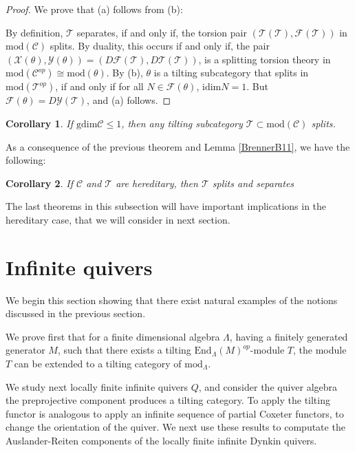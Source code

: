 \documentclass{amsart}
\theoremstyle{plain}
\newtheorem{corollary}{Corollary}
\numberwithin{equation}{section}
\begin{document}
\begin{proof}
We prove that (a) follows from (b):

By definition, $\mathcal{T}$ separates, if and only if, the torsion pair $(\mathscr{T}(\mathcal{T}),\mathscr{F}(\mathcal{T}))$ in $\mathrm{mod}(\mathcal{C})$ splits. By duality, this occurs if and only if, the pair $(\mathscr{X}(\theta ),\mathscr{Y}(\theta ))=(D\mathscr{F}(\mathcal{T}),D\mathscr{T}(\mathcal{T}))$, is a splitting torsion theory in $\mathrm{mod}(\mathcal{C}^{op})\cong \mathrm{mod}(\theta )$. By (b), $\theta $ is a
tilting subcategory that splits in $\mathrm{mod}(\mathcal{T}^{op})$, if and
only if for all $N\in \mathscr F(\theta )$, $\mathrm{idim}N=1$. But $\mathscr{F}(\theta )=D\mathscr{Y}(\mathcal{T})$, and (a) follows.
\end{proof}

\begin{corollary}
If $\mathrm{gdim}\mathcal{C}\leq 1$, then any tilting subcategory $\mathcal{T}\subset \mathrm{mod}(\mathcal{C})$ splits.
\end{corollary}

As a consequence of the previous theorem and Lemma \ref{BrennerB11}, we have
the following:

\begin{corollary}
If $\mathcal{C}$ and $\mathcal{T}$ are hereditary, then $\mathcal{T}$ splits
and separates
\end{corollary}

The last theorems in this subsection will have important implications in the
hereditary case, that we will consider in next section.

\section{Infinite quivers}

We begin this section showing that there exist natural examples of the
notions discussed in the previous section.

We prove first that for a finite dimensional algebra $\Lambda $, having a
finitely generated generator $M$, such that there exists a tilting $\mathrm{End}_{\Lambda }(M)^{op}$-module $T$, the module $T$ can be extended to a
tilting category of $\mathrm{mod}_{\Lambda }.$

We study next locally finite infinite quivers $Q$, and consider the quiver
algebra 
the preprojective component produces a tilting category. To apply the
tilting functor is analogous to apply an infinite sequence of partial
Coxeter functors, to change the orientation of the quiver. We next use these
results to computate the Auslander-Reiten components of the locally finite
infinite Dynkin quivers.
\end{document}
